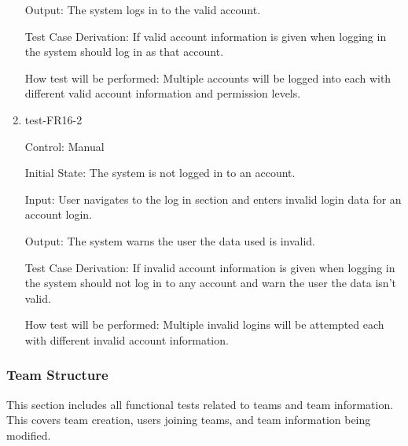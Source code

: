 \documentclass[12pt, titlepage]{article}
\begin{document}
\begin{enumerate}
  Output: The system logs in to the valid account.
  
  Test Case Derivation: If valid account information is given when logging in
  the system should log in as that account.
  
  How test will be performed: Multiple accounts will be logged into each with
  different valid account information and permission levels.

  \item{test-FR16-2\\}

  Control: Manual
            
  Initial State: The system is not logged in to an account.
            
  Input: User navigates to the log in section and enters invalid login data
  for an account login.
            
  Output: The system warns the user the data used is invalid.
  
  Test Case Derivation: If invalid account information is given when logging
  in the system should not log in to any account and warn the user the data
  isn't valid.
  
  How test will be performed: Multiple invalid logins will be attempted each
  with different invalid account information.

\end{enumerate}

\subsubsection{Team Structure}

This section includes all functional tests related to teams and team
information. This covers team creation, users joining teams, and team
information being modified.
\end{document}
